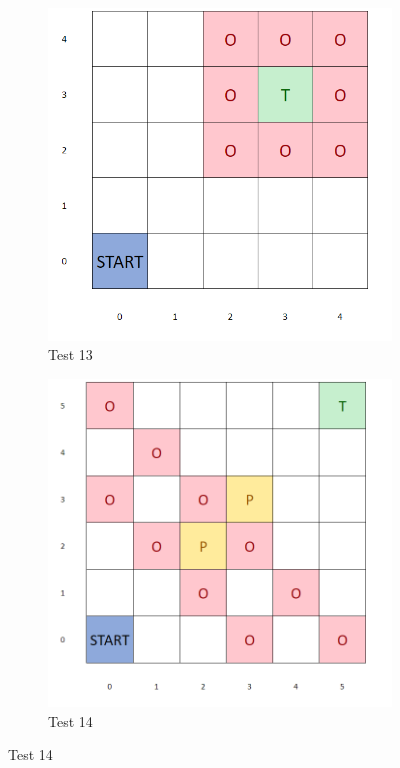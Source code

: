 \documentclass{article}
\begin{document}
\begin{appendices}
\begin{figure}[H]
   	 \centering
     \begin{subfigure}[b]{0.45\textwidth}
         \centering
         \includegraphics[width=\textwidth]{images/test13.png}
         \caption{Test 13}
         \label{fig:test113}
     \end{subfigure}
     \hfill
     \begin{subfigure}[b]{0.45\textwidth}
         \centering
         \includegraphics[width=\textwidth]{images/test14.png}
         \caption{Test 14}
         \label{fig:test114}
     \end{subfigure}
\end{figure}


\end{appendices}
\end{document}
